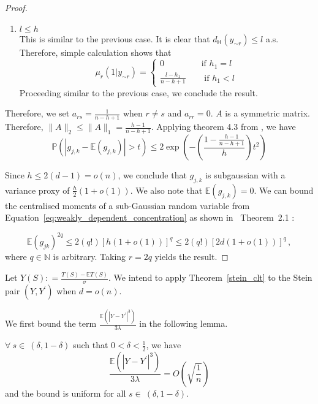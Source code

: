 \documentclass[final,12pt]{colt2018}
\begin{document}
\begin{proof}
\begin{enumerate}
\item $l \leq h$ \\
This is similar to the previous case. It is clear that $d_{\mathsf{H}}(y_{\sim r}) \leq l$ a.s. 
Therefore, simple calculation shows that 
\begin{equation}
\mu_{r}(1|y_{\sim r}) = 
\begin{cases}
0 &\quad \text{if $h_1 = l$} \\
\frac{l-h_1}{n-h+1} &\quad \text{ if $h_1 < l$}
\end{cases}
\end{equation}
Proceeding similar to the previous case, we conclude the result.
\end{enumerate}

Therefore, we set $a_{rs} = \frac{1}{n-h+1}$ when $r\neq s$ and $a_{rr} = 0$. $A$ is a symmetric matrix. Therefore, $\|A\|_2 \leq \|A\|_1 = \frac{h-1}{n-h+1}$. 
Applying theorem 4.3 from \citet{chatterjee2005concentration}, we have 
\begin{equation}
\mathbb{P}(|g_{j,k} -\mathbb{E}(g_{j,k})| > t) \leq 2\exp{\left(-\left(\frac{1-\frac{h-1}{n-h+1}}{h}\right)t^2\right)}
\label{eq:weakly_dependent_concentration}
\end{equation}

Since $h \leq 2(d-1) = o(n)$, we conclude that $g_{j,k}$ is subgaussian with a variance proxy of $\frac{h}{2}(1+o(1))$. We also note that $\mathbb{E}(g_{j,k}) = 0$. We can bound the centralised moments of a sub-Gaussian random variable from Equation~\eqref{eq:weakly_dependent_concentration} as shown in~\citet{boucheron2013concentration} Theorem~2.1 : 

\begin{equation}
\mathbb{E}(g_{jk})^{2q} \leq 2(q!)[h(1+o(1))]^q  \leq 2(q!)[2d(1+o(1))]^q\,,
\label{moment_sub_gaussian_bound}
\end{equation}
where $q \in \mathbb{N}$ is arbitrary. Taking $r = 2q$ yields the result.
\end{proof}


Let $Y(S) : = \frac{T(S) - \mathbb{E}T(S)}{\sigma}$. We intend to apply Theorem~\ref{stein_clt} to the Stein pair $(Y,Y^{\prime})$ when $d = o(n)$. 

We first bound the term $\frac{\mathbb{E}\left(|Y-Y^{\prime}|^3\right)}{3\lambda}$ in the following lemma. 

\begin{lemma}
\label{stein_bound_1}
$\forall \  s \in \ (\delta,1-\delta)$ such that $0<\delta < \frac{1}{2}$, we have $$\frac{\mathbb{E}\left(|Y-Y^{\prime}|^3\right)}{3\lambda} = O\left(\sqrt{\frac{1}{n}}\right)$$ and the bound is uniform for all $s \in \ (\delta,1-\delta)$.
\end{lemma}
\end{document}
